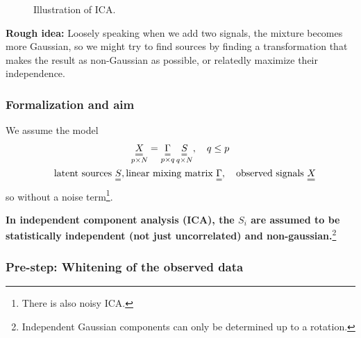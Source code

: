 \begin{figure}[!htb]
    \centering
    
    \caption{Illustration of ICA.}
    \label{fig:ica_illu}
\end{figure}

\textbf{Rough idea:} Loosely speaking when we add two signals, the mixture becomes more Gaussian,
so we might try to find sources by finding a transformation that makes the result as non-Gaussian as possible,
or relatedly maximize their independence.


\subsubsection{Formalization and aim}

We assume the model
\begin{equation}
    \begin{gathered}
        \underset{p\times N}{\mat{X}} = \underset{p\times q}{\mat{\Gamma}} \, \underset{q\times N}{\mat{S}}, \quad q \leq p \\
        \quad \text{latent sources } \mat{S}, \text{linear mixing matrix } \mat{\Gamma}, \quad \text{observed signals } \mat{X}
    \end{gathered}
\end{equation}
so without a noise term\footnote{There is also noisy ICA.}.

\textbf{In independent component analysis (ICA), the $S_i$ are assumed to be statistically independent (not just
uncorrelated) and non-gaussian.}\footnote{Independent Gaussian components can only be determined up to a rotation.}


\subsubsection{Pre-step: Whitening of the observed data}

